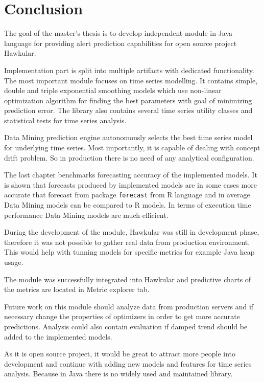 \chapter{Conclusion} \label{chap:conclusion}
The goal of the master's thesis is to develop independent module in Java language for providing alert prediction
capabilities for open source project Hawkular.


Implementation part is split into multiple artifacts with dedicated functionality. The most important module
focuses on time series modelling. It contains simple, double and triple exponential smoothing models which
use non-linear optimization algorithm for finding the best parameters with goal of minimizing prediction error.
The library also contains several time series utility classes and statistical tests for time series analysis.

Data Mining prediction engine autonomously selects the best time series model for underlying time series. Most
importantly, it is capable of dealing with concept drift problem. So in production there is no need of any
analytical configuration.

The last chapter benchmarks forecasting accuracy of the implemented models. It is shown that forecasts produced by
implemented models are in some cases more accurate that forecast from package \texttt{forecast} from R language and
in average Data Mining models can be compared to R models. In terms of execution time performance Data Mining
models are much efficient.

During the development of the module, Hawkular was still in development phase, therefore it was not
possible to gather real data from production environment. This would help with tunning models for specific metrics
for example Java heap usage.

The module was successfully integrated into Hawkular and predictive charts of the metrics are located in Metric explorer
tab.

Future work on this module should analyze data from production servers and if necessary change the properties of
optimizers in order to get more accurate predictions. Analysis could also contain evaluation if damped trend should be
added to the implemented models.

As it is open source project, it would be great to attract more people into development and continue with adding new
models and features for time series analysis. Because in Java there is no widely used and maintained library.

